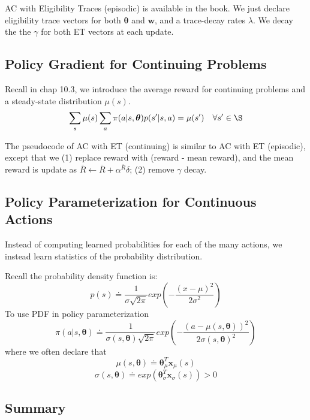 \documentclass[sutton_barto_notes.tex]{subfiles}
\begin{document}
AC with Eligibility Traces (episodic) is available in the book. We just declare eligibility trace vectors for both $\bm{\theta}$ and $\bm{w}$, and a trace-decay rates $\lambda$. We decay the the $\gamma$ for both ET vectors at each update.

\subsection{Policy Gradient for Continuing Problems}

Recall in chap 10.3, we introduce the average reward for continuing problems and a steady-state distribution $\mu(s)$.
$$\sum_s \mu(s) \sum_a \pi(a|s,\bm{\theta}) p(s'|s,a) = \mu(s')\quad \forall s' \in \S$$

The pseudocode of AC with ET (continuing) is similar to AC with ET (episodic), except that we (1) replace reward with (reward - mean reward), and the mean reward is update as $\overline{R}\leftarrow\overline{R}+\alpha^{\overline{R}}\delta$; (2) remove $\gamma$ decay.

\subsection{Policy Parameterization for Continuous Actions}

Instead of computing learned probabilities for each of the many actions, we instead learn statistics of the probability distribution.

Recall the probability density function is:
$$p(s)\doteq\frac{1}{\sigma\sqrt{2\pi}}exp(-\frac{(x-\mu)^2}{2\sigma^2})$$
To use PDF in policy parameterization
$$\pi(a|s,\bm{\theta}) \doteq\frac{1}{\sigma(s,\bm{\theta}) \sqrt{2\pi}}exp(-\frac{(a -\mu(s,\bm{\theta}))^2}{2\sigma(s,\bm{\theta})^2})$$
where we often declare that
$$\mu(s,\bm{\theta})\doteq \bm{\theta}_\mu^T \bm{x}_\mu (s)$$
$$\sigma(s,\bm{\theta}) \doteq exp(\bm{\theta}_\sigma^T \bm{x}_\sigma(s)) > 0$$

\subsection{Summary}
\end{document}
